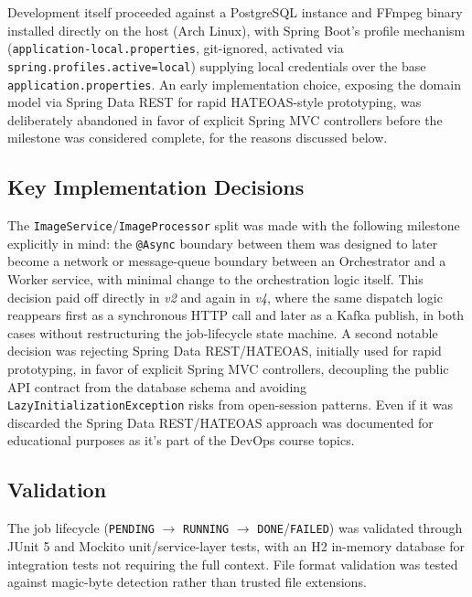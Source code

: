\documentclass[twoside]{supsistudent}
\begin{document}
Development itself proceeded against a PostgreSQL instance and FFmpeg binary installed directly on the host (Arch Linux), with Spring Boot's profile mechanism \\ (\texttt{application-local.properties}, git-ignored, activated via \\ \texttt{spring.profiles.active=local}) supplying local credentials over the base \\ \texttt{application.properties}. An early implementation choice, exposing the domain model via Spring Data REST for rapid HATEOAS-style prototyping, was deliberately abandoned in favor of explicit Spring MVC controllers before the milestone was considered complete, for the reasons discussed below.

\subsection{Key Implementation Decisions}
The \texttt{ImageService}/\texttt{ImageProcessor} split was made with the following milestone explicitly in mind: the \texttt{@Async} boundary between them was designed to later become a network or message-queue boundary between an Orchestrator and a Worker service, with minimal change to the orchestration logic itself. This decision paid off directly in \emph{v2} and again in \emph{v4}, where the same dispatch logic reappears first as a synchronous HTTP call and later as a Kafka publish, in both cases without restructuring the job-lifecycle state machine. A second notable decision was rejecting Spring Data REST/HATEOAS, initially used for rapid prototyping, in favor of explicit Spring MVC controllers, decoupling the public API contract from the database schema and avoiding \texttt{LazyInitializationException} risks from open-session patterns. Even if it was discarded the Spring Data REST/HATEOAS approach was documented for educational purposes as it's part of the DevOps course topics.

\subsection{Validation}
The job lifecycle (\texttt{PENDING} $\rightarrow$ \texttt{RUNNING} $\rightarrow$ \texttt{DONE}/\texttt{FAILED}) was validated through JUnit 5 and Mockito unit/service-layer tests, with an H2 in-memory database for integration tests not requiring the full context. File format validation was tested against magic-byte detection rather than trusted file extensions.
\end{document}
